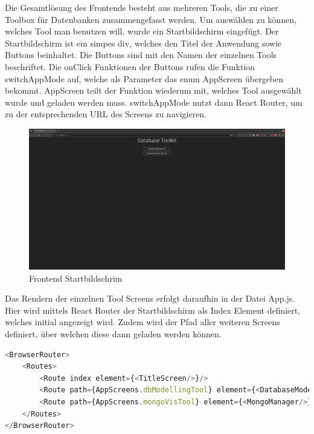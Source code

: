 Die Gesamtlösung des Frontends besteht aus mehreren Tools, die zu einer Toolbox für Datenbanken zusammengefasst werden.
Um auswählen zu können, welches Tool man benutzen will, wurde ein Startbildschirm eingefügt.
Der Startbildschirm ist ein simpes div, welches den Titel der Anwendung sowie Buttons beinhaltet.
Die Buttons sind mit den Namen der einzelnen Tools beschriftet.
Die onClick Funktionen der Buttons rufen die Funktion switchAppMode auf, welche als Parameter das enum AppScreen übergeben bekommt.
AppScreen teilt der Funktion wiederum mit, welches Tool ausgewählt wurde und geladen werden muss.
switchAppMode nutzt dann React Router, um zu der entsprechenden URL des Screens zu navigieren.

\begin{figure}[H]
    \includegraphics[width=\textwidth]{images/frontend_titlescreen}
    \caption{Frontend Startbildschrim}
    \label{fig:frontend_titlescreen}
\end{figure}

Das Rendern der einzelnen Tool Screens erfolgt daraufhin in der Datei App.js.
Hier wird mittels React Router der Startbildschirm als Index Element definiert, welches initial angezeigt wird.
Zudem wird der Pfad aller weiteren Screens definiert, über welchen diese dann geladen werden können.

\begin{lstlisting}[language=JavaScript, caption={React Router in App.js},label={lst:app.js}]
<BrowserRouter>
    <Routes>
        <Route index element={<TitleScreen/>}/>
        <Route path={AppScreens.dbModellingTool} element={<DatabaseModellingTool/>}/>
        <Route path={AppScreens.mongoVisTool} element={<MongoManager/>}/>
    </Routes>
</BrowserRouter>
\end{lstlisting}

